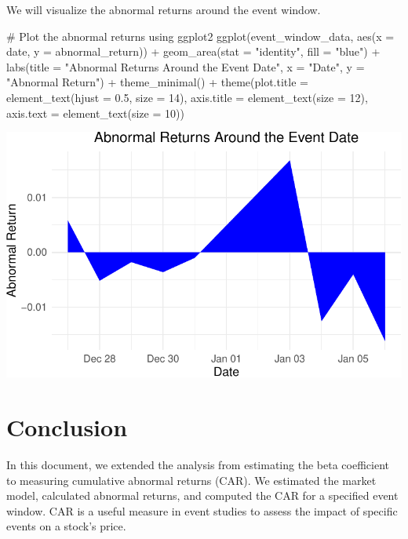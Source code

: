 \documentclass[
]{scrartcl}
\newenvironment{Shaded}{\begin{snugshade}}{\end{snugshade}}
\newcommand{\AttributeTok}[1]{\textcolor[rgb]{0.40,0.45,0.13}{#1}}
\newcommand{\CommentTok}[1]{\textcolor[rgb]{0.37,0.37,0.37}{#1}}
\newcommand{\DecValTok}[1]{\textcolor[rgb]{0.68,0.00,0.00}{#1}}
\newcommand{\FloatTok}[1]{\textcolor[rgb]{0.68,0.00,0.00}{#1}}
\newcommand{\FunctionTok}[1]{\textcolor[rgb]{0.28,0.35,0.67}{#1}}
\newcommand{\NormalTok}[1]{\textcolor[rgb]{0.00,0.23,0.31}{#1}}
\newcommand{\SpecialCharTok}[1]{\textcolor[rgb]{0.37,0.37,0.37}{#1}}
\newcommand{\StringTok}[1]{\textcolor[rgb]{0.13,0.47,0.30}{#1}}
\begin{document}
We will visualize the abnormal returns around the event window.

\begin{Shaded}
\begin{Highlighting}[]
\CommentTok{\# Plot the abnormal returns using ggplot2}
\FunctionTok{ggplot}\NormalTok{(event\_window\_data, }\FunctionTok{aes}\NormalTok{(}\AttributeTok{x =}\NormalTok{ date, }\AttributeTok{y =}\NormalTok{ abnormal\_return)) }\SpecialCharTok{+}
  \FunctionTok{geom\_area}\NormalTok{(}\AttributeTok{stat =} \StringTok{"identity"}\NormalTok{, }\AttributeTok{fill =} \StringTok{"blue"}\NormalTok{) }\SpecialCharTok{+}
  \FunctionTok{labs}\NormalTok{(}\AttributeTok{title =} \StringTok{"Abnormal Returns Around the Event Date"}\NormalTok{,}
       \AttributeTok{x =} \StringTok{"Date"}\NormalTok{,}
       \AttributeTok{y =} \StringTok{"Abnormal Return"}\NormalTok{) }\SpecialCharTok{+}
  \FunctionTok{theme\_minimal}\NormalTok{() }\SpecialCharTok{+}
  \FunctionTok{theme}\NormalTok{(}\AttributeTok{plot.title =} \FunctionTok{element\_text}\NormalTok{(}\AttributeTok{hjust =} \FloatTok{0.5}\NormalTok{, }\AttributeTok{size =} \DecValTok{14}\NormalTok{),}
        \AttributeTok{axis.title =} \FunctionTok{element\_text}\NormalTok{(}\AttributeTok{size =} \DecValTok{12}\NormalTok{),}
        \AttributeTok{axis.text =} \FunctionTok{element\_text}\NormalTok{(}\AttributeTok{size =} \DecValTok{10}\NormalTok{))}
\end{Highlighting}
\end{Shaded}

\includegraphics{CAR_files/figure-pdf/unnamed-chunk-8-1.pdf}

\section{Conclusion}\label{conclusion}

In this document, we extended the analysis from estimating the beta
coefficient to measuring cumulative abnormal returns (CAR). We estimated
the market model, calculated abnormal returns, and computed the CAR for
a specified event window. CAR is a useful measure in event studies to
assess the impact of specific events on a stock's price.
\end{document}
